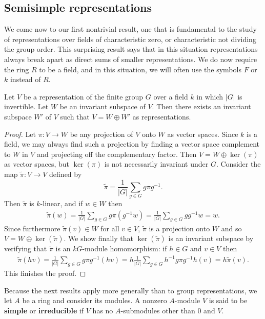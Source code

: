 \subsection{Semisimple representations}
We come now to our first nontrivial result, one that is fundamental to the study of representations over fields of characteristic zero, or characteristic not dividing the group order. This surprising result says that in this situation representations always break apart as direct sums of smaller representations. We do now require the ring $R$ to be a field, and in this situation, we will often use the symbols $F$ or $k$ instead of $R$.
\begin{theorem}
Let $V$ be a representation of the finite group $G$ over a field $k$ in which $|G|$ is invertible. Let $W$ be an invariant subspace of $V$. Then there exists an invariant subspace $W'$ of $V$ such that $V=W\oplus W'$ as
representations.
\end{theorem}
\begin{proof}
Let $\pi:V\to W$ be any projection of $V$ onto $W$ as vector spaces. Since $k$ is a field, we may always find such a projection by finding a vector space complement to $W$ in $V$ and projecting off the complementary factor. Then $V=W\oplus\ker(\pi)$ as vector spaces, but $\ker(\pi)$ is not necessarily invariant under $G$. Consider the map $\widetilde{\pi}:V\to V$ defined by
\[\widetilde{\pi}=\frac{1}{|G|}\sum_{g\in G}g\pi g^{-1}.\]
Then $\widetilde{\pi}$ is $k$-linear, and if $w\in W$ then
\begin{align*}
\widetilde{\pi}(w)=\frac{1}{|G|}\sum_{g\in G}g\pi(g^{-1} w)=\frac{1}{|G|}\sum_{g\in G}gg^{-1}w=w.
\end{align*}
Since furthermore $\widetilde{\pi}(v)\in W$ for all $v\in V$, $\widetilde{\pi}$ is a projection onto $W$ and so $V=W\oplus\ker(\widetilde{\pi})$. We show finally that $\ker(\widetilde{\pi})$ is an invariant subspace by verifying that $\widetilde{\pi}$ is an $kG$-module homomorphism: if $h\in G$ and $v\in V$ then
\begin{align*}
\widetilde{\pi}(hv)=\frac{1}{|G|}\sum_{g\in G}g\pi g^{-1}(hv)=h\frac{1}{|G|}\sum_{g\in G}h^{-1}g\pi g^{-1}h(v)=h\widetilde{\pi}(v).
\end{align*}
This finishes the proof.
\end{proof}
Because the next results apply more generally than to group representations,
we let $A$ be a ring and consider its modules. A nonzero $A$-module $V$ is
said to be \textbf{simple} or \textbf{irreducible} if $V$ has no $A$-submodules other than $0$ and $V$.
